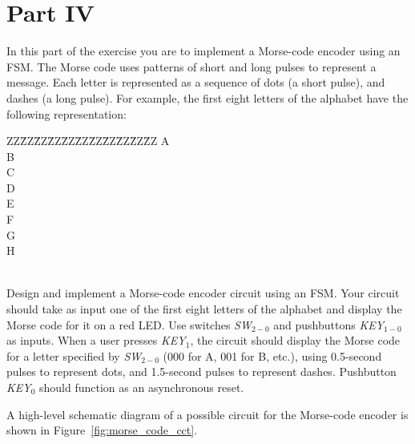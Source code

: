\documentclass[epsfig,10pt,fullpage]{article}
\begin{document}
\section*{Part IV}
In this part of the exercise you are to implement a Morse-code encoder using an FSM. The Morse code uses
patterns of short and long pulses to represent a message. Each letter is represented as a sequence of dots
(a short pulse), and dashes (a long pulse). For example, the first eight letters of the alphabet have the
following representation:
~\\
\begin{center}
\begin{minipage}[t]{12.5 cm}
\begin{tabbing}
ZZ\=ZZ\=ZZ\=ZZ\=ZZ\=ZZ\=ZZ\=ZZ\=ZZ\=ZZ\=ZZ\kill
\>A\>\>{\bf $\bullet$  ---}\\
\>B\>\>{\bf ---  $\bullet$  $\bullet$  $\bullet$}\\
\>C\>\>{\bf ---  $\bullet$  ---  $\bullet$}\\
\>D\>\>{\bf ---  $\bullet$  $\bullet$}\\
\>E\>\>{\bf $\bullet$}\\
\>F\>\>{\bf $\bullet$  $\bullet$  ---  $\bullet$}\\
\>G\>\>{\bf ---  ---  $\bullet$}\\
\>H\>\>{\bf $\bullet$  $\bullet$  $\bullet$  $\bullet$}\\
\end{tabbing}
\end{minipage}
\end{center}

~\\
Design and implement a Morse-code encoder circuit using an FSM. Your circuit should take as input one of the first eight letters of the alphabet and display the Morse code for it on a red LED. Use switches {\it SW}$_{2-0}$ and pushbuttons {\it KEY}$_{1-0}$ as inputs. When a user presses {\it KEY}$_1$, the circuit should display the Morse code for a letter specified by {\it SW}$_{2-0}$ (000 for A, 001 for B, etc.), using 0.5-second pulses to represent dots, and 1.5-second pulses to represent dashes. Pushbutton {\it KEY}$_0$ should function as an asynchronous reset. 

A high-level schematic diagram of a possible circuit for the Morse-code encoder 
is shown in Figure~\ref{fig:morse_code_cct}.
\end{document}
